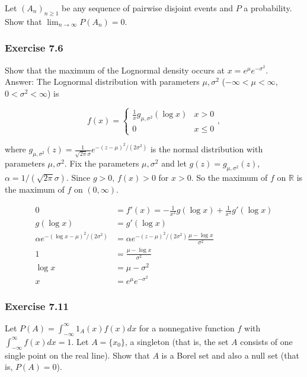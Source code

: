 \documentclass{article}
\begin{document}
{Let $(A_n)_{n\geq 1}$ be any sequence of pairwise disjoint events and $P$ a probability. Show that $\lim_{n\rightarrow \infty} P(A_n) = 0$.

\subsubsection*{Exercise 7.6}

Show that the maximum of the Lognormal density occurs at $x = e^{\mu}e^{-\sigma^2}$.\\

Answer: The Lognormal distribution with parameters $\mu, \sigma^2$ ($-\infty < \mu < \infty$, $0< \sigma^2 < \infty$) is

$$
f(x) = \begin{cases}
\frac{1}{x}g_{\mu , \sigma^2}(\log x) & x > 0 \\
0 & x \leq 0
\end{cases},
$$

where $g_{\mu ,\sigma^2}(z) = \frac{1}{\sqrt{2\pi} \sigma}e^{-(z-\mu)^2 / (2\sigma^2)}$ is the normal distribution with parameters $\mu , \sigma^2$. Fix the parameters $\mu, \sigma^2$ and let $g(z) = g_{\mu ,\sigma^2}(z)$, $\alpha = 1/(\sqrt{2\pi}\sigma)$. Since $g > 0$, $f(x) > 0$ for $x >0$. So the maximum of $f$ on $\mathbb{R}$ is the maximum of $f$ on $(0,\infty)$. 

\begin{align*}
0 &= f'(x) = -\frac{1}{x^2}g(\log x) + \frac{1}{x^2}g'(\log x) \\
g(\log x) &= g'(\log x) \\
\alpha e^{-(\log x -\mu)^2 / (2\sigma^2)} &=
\alpha e^{-(z-\mu)^2 / (2\sigma^2)}\frac{\mu - \log x}{\sigma^2} \\
1 &= \frac{\mu - \log x}{\sigma^2} \\
\log x &= \mu - \sigma^2 \\
x &= e^\mu e^{-\sigma^2}
\end{align*}

\subsubsection*{Exercise 7.11}

Let $P(A) = \int_{-\infty}^\infty 1_{A}(x)f(x)dx$ for a nonnegative function $f$ with $\int_{-\infty}^\infty f(x)dx = 1$. Let $A = \{x_0\}$, a singleton (that is, the set $A$ consists of one single point on the real line). Show that $A$ is a Borel set and also a null set (that is, $P(A) = 0$). \\

}
\end{document}
